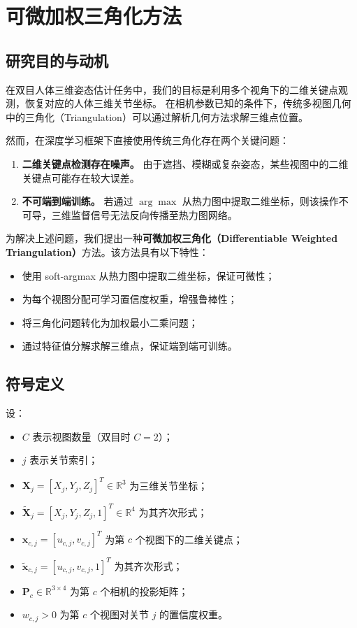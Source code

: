 \section{可微加权三角化方法}

\subsection{研究目的与动机}

在双目人体三维姿态估计任务中，我们的目标是利用多个视角下的二维关键点观测，恢复对应的人体三维关节坐标。
在相机参数已知的条件下，传统多视图几何中的三角化（Triangulation）可以通过解析几何方法求解三维点位置。

然而，在深度学习框架下直接使用传统三角化存在两个关键问题：

\begin{enumerate}
    \item \textbf{二维关键点检测存在噪声。} 由于遮挡、模糊或复杂姿态，某些视图中的二维关键点可能存在较大误差。
    \item \textbf{不可端到端训练。} 若通过 $\arg\max$ 从热力图中提取二维坐标，则该操作不可导，三维监督信号无法反向传播至热力图网络。
\end{enumerate}

为解决上述问题，我们提出一种\textbf{可微加权三角化（Differentiable Weighted Triangulation）}方法。该方法具有以下特性：

\begin{itemize}
    \item 使用 soft-argmax 从热力图中提取二维坐标，保证可微性；
    \item 为每个视图分配可学习置信度权重，增强鲁棒性；
    \item 将三角化问题转化为加权最小二乘问题；
    \item 通过特征值分解求解三维点，保证端到端可训练。
\end{itemize}

\subsection{符号定义}

设：

\begin{itemize}
    \item $C$ 表示视图数量（双目时 $C=2$）；
    \item $j$ 表示关节索引；
    \item $\mathbf{X}_j = [X_j, Y_j, Z_j]^T \in \mathbb{R}^3$ 为三维关节坐标；
    \item $\tilde{\mathbf{X}}_j = [X_j, Y_j, Z_j, 1]^T \in \mathbb{R}^4$ 为其齐次形式；
    \item $\mathbf{x}_{c,j} = [u_{c,j}, v_{c,j}]^T$ 为第 $c$ 个视图下的二维关键点；
    \item $\tilde{\mathbf{x}}_{c,j} = [u_{c,j}, v_{c,j}, 1]^T$ 为其齐次形式；
    \item $\mathbf{P}_c \in \mathbb{R}^{3\times4}$ 为第 $c$ 个相机的投影矩阵；
    \item $w_{c,j} > 0$ 为第 $c$ 个视图对关节 $j$ 的置信度权重。
\end{itemize}

